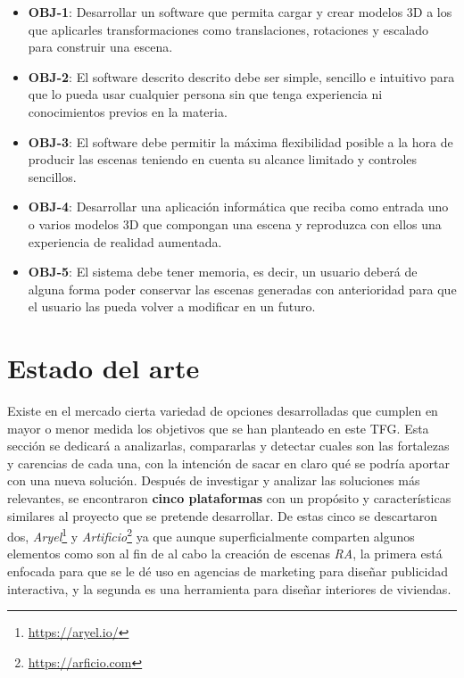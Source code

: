 \begin{itemize}
    \item \textbf{OBJ-1}: Desarrollar un software que permita cargar y crear modelos 3D a los que aplicarles transformaciones como translaciones, rotaciones y escalado para construir una escena.
    \item \textbf{OBJ-2}: El software descrito descrito debe ser simple, sencillo e intuitivo para que lo pueda usar cualquier persona sin que tenga experiencia ni conocimientos previos en la materia.
    \item \textbf{OBJ-3}: El software debe permitir la máxima flexibilidad posible a la hora de producir las escenas teniendo en cuenta su alcance limitado y controles sencillos.
    \item \textbf{OBJ-4}: Desarrollar una aplicación informática que reciba como entrada uno o varios modelos 3D que compongan una escena y reproduzca con ellos una experiencia de realidad aumentada.
    \item \textbf{OBJ-5}: El sistema debe tener memoria, es decir, un usuario deberá de alguna forma poder conservar las escenas generadas con anterioridad para que el usuario las pueda volver a modificar en un futuro.
\end{itemize}

\section{Estado del arte}

Existe en el mercado cierta variedad de opciones desarrolladas que cumplen en mayor o menor medida los objetivos que se han planteado en este TFG. Esta sección se dedicará a analizarlas, compararlas y detectar cuales son las fortalezas y carencias de cada una, con la intención de sacar en claro qué se podría aportar con una nueva solución. Después de investigar y analizar las soluciones más relevantes, se encontraron \textbf{cinco plataformas} con un propósito y características similares al proyecto que se pretende desarrollar. De estas cinco se descartaron dos, \textit{Aryel}\footnote{\url{https://aryel.io/}} y \textit{Artificio}\footnote{\url{https://arficio.com}} ya que aunque superficialmente comparten algunos elementos como son al fin de al cabo la creación de escenas \textit{RA}, la primera está enfocada para que se le dé uso en agencias de marketing para diseñar publicidad interactiva, y la segunda es una herramienta para diseñar interiores de viviendas.

